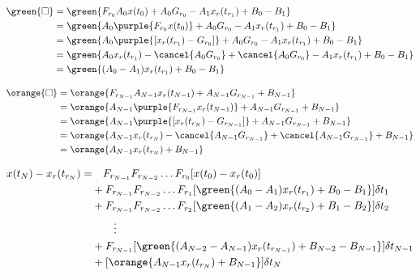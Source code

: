 \begin{align}
	\green{\square} &= \green{F_{r_0} A_0 x(t_0) + A_0 G_{r_0} - A_1 x_r(t_{r_1}) + B_0 - B_1} \nonumber \\
					&= \green{A_0 \purple{F_{r_0} x(t_0)} + A_0 G_{r_0} - A_1 x_r(t_{r_1}) + B_0 - B_1} \nonumber \\
					&= \green{A_0 \purple{[x_r(t_{r_1}) - G_{r_0}]} + A_0 G_{r_0} - A_1 x_r(t_{r_1}) + B_0 - B_1} \nonumber \\
					&= \green{A_0 x_r(t_{r_1}) - \cancel{A_0 G_{r_0}} + \cancel{A_0 G_{r_0}} - A_1 x_r(t_{r_1}) + B_0 - B_1} \nonumber \\
					&= \green{(A_0 - A_1) x_r(t_{r_1}) + B_0 - B_1}
\end{align}

\begin{align}
	\orange{\square} &= \orange{F_{r_{N-1}} A_{N-1} x_r(t_{N-1}) + A_{N-1} G_{r_{N-1}} + B_{N-1}} \nonumber \\
					 &= \orange{A_{N-1} \purple{F_{r_{N-1}} x_r(t_{N-1})} + A_{N-1} G_{r_{N-1}} + B_{N-1}} \nonumber \\
					 &= \orange{A_{N-1} \purple{[x_r(t_{r_N}) - G_{r_{N-1}}]} + A_{N-1} G_{r_{N-1}} + B_{N-1}} \nonumber \\
					 &= \orange{A_{N-1} x_r(t_{r_N}) - \cancel{A_{N-1} G_{r_{N-1}}} + \cancel{A_{N-1} G_{r_{N-1}}} + B_{N-1}} \nonumber \\
					 &= \orange{A_{N-1} x_r(t_{r_N}) + B_{N-1}}
\end{align}

\begin{align}
	\begin{split}
		x(t_N) - x_r(t_{r_N}) =  & \quad F_{r_{N-1}}F_{r_{N-2}} \ldots F_{r_0} [x(t_0) - x_r(t_0)] \\
								 & + F_{r_{N-1}}F_{r_{N-2}} \ldots F_{r_1} [\green{(A_0 - A_1) x_r(t_{r_1}) + B_0 - B_1}] \delta t_1 \\
								 & + F_{r_{N-1}}F_{r_{N-2}} \ldots F_{r_2} [\green{(A_1 - A_2) x_r(t_{r_2}) + B_1 - B_2}] \delta t_2 \\
								 & \qquad \vdots \\
								 & + F_{r_{N-1}}[\green{(A_{N-2} - A_{N-1}) x_r(t_{r_{N-1}}) + B_{N-2} - B_{N-1}}] \delta t_{N-1} \\
							     & + [\orange{A_{N-1} x_r(t_{r_N}) + B_{N-1}}] \delta t_N
	\end{split}
\end{align}

